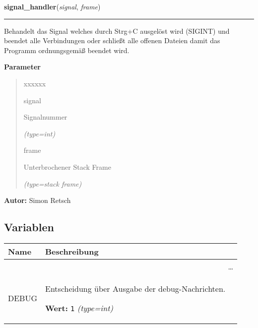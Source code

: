 \hspace{.8\funcindent}\begin{boxedminipage}{\funcwidth}

    \raggedright \textbf{signal\_handler}(\textit{signal}, \textit{frame})

    \vspace{-1.5ex}

    \rule{\textwidth}{0.5\fboxrule}
\setlength{\parskip}{2ex}
    Behandelt das Signal welches durch Strg+C ausgelöst wird (SIGINT) und 
    beendet alle Verbindungen oder schließt alle offenen Dateien damit das 
    Programm ordnungsgemäß beendet wird.

\setlength{\parskip}{1ex}
      \textbf{Parameter}
      \vspace{-1ex}

      \begin{quote}
        \begin{Ventry}{xxxxxx}

          \item[signal]

          Signalnummer

            {\it (type=int)}

          \item[frame]

          Unterbrochener Stack Frame

            {\it (type=stack frame)}

        \end{Ventry}

      \end{quote}

\textbf{Autor:} Simon Retsch



    \end{boxedminipage}



  \subsection{Variablen}

    \vspace{-1cm}
\hspace{\varindent}\begin{longtable}{|p{\varnamewidth}|p{\vardescrwidth}|l}
\cline{1-2}
\cline{1-2} \centering \textbf{Name} & \centering \textbf{Beschreibung}& \\
\cline{1-2}
\endhead\cline{1-2}\multicolumn{3}{r}{\small\ldots}\\\endfoot\cline{1-2}
\endlastfoot\raggedright D\-E\-B\-U\-G\- & \raggedright Entscheidung über Ausgabe der debug-Nachrichten.

\textbf{Wert:} 
{\tt 1}            {\it (type=int)}&\\
\cline{1-2}
\end{longtable}

